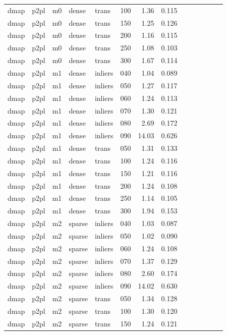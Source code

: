 \begin{table}[htbp]
\begin{tabular}{llllllrrrrrrrr}
  dmap & p2pl & m0 & dense & trans & 100 & 1.36 & 0.115 \\
  dmap & p2pl & m0 & dense & trans & 150 & 1.25 & 0.126 \\
  dmap & p2pl & m0 & dense & trans & 200 & 1.16 & 0.115 \\
  dmap & p2pl & m0 & dense & trans & 250 & 1.08 & 0.103 \\
  dmap & p2pl & m0 & dense & trans & 300 & 1.67 & 0.114 \\
  dmap & p2pl & m1 & dense & inliers & 040 & 1.04 & 0.089 \\
  dmap & p2pl & m1 & dense & inliers & 050 & 1.27 & 0.117 \\
  dmap & p2pl & m1 & dense & inliers & 060 & 1.24 & 0.113 \\
  dmap & p2pl & m1 & dense & inliers & 070 & 1.30 & 0.121 \\
  dmap & p2pl & m1 & dense & inliers & 080 & 2.69 & 0.172 \\
  dmap & p2pl & m1 & dense & inliers & 090 & 14.03 & 0.626 \\
  dmap & p2pl & m1 & dense & trans & 050 & 1.31 & 0.133 \\
  dmap & p2pl & m1 & dense & trans & 100 & 1.24 & 0.116 \\
  dmap & p2pl & m1 & dense & trans & 150 & 1.21 & 0.116 \\
  dmap & p2pl & m1 & dense & trans & 200 & 1.24 & 0.108 \\
  dmap & p2pl & m1 & dense & trans & 250 & 1.14 & 0.105 \\
  dmap & p2pl & m1 & dense & trans & 300 & 1.94 & 0.153 \\
  dmap & p2pl & m2 & sparse & inliers & 040 & 1.03 & 0.087 \\
  dmap & p2pl & m2 & sparse & inliers & 050 & 1.02 & 0.090 \\
  dmap & p2pl & m2 & sparse & inliers & 060 & 1.24 & 0.108 \\
  dmap & p2pl & m2 & sparse & inliers & 070 & 1.37 & 0.129 \\
  dmap & p2pl & m2 & sparse & inliers & 080 & 2.60 & 0.174 \\
  dmap & p2pl & m2 & sparse & inliers & 090 & 14.02 & 0.630 \\
  dmap & p2pl & m2 & sparse & trans & 050 & 1.34 & 0.128 \\
  dmap & p2pl & m2 & sparse & trans & 100 & 1.30 & 0.120 \\
  dmap & p2pl & m2 & sparse & trans & 150 & 1.24 & 0.121 \\

\end{tabular}
\end{table}
